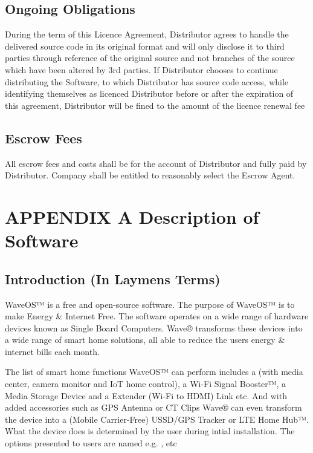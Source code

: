 \documentclass[letterpaper,10pt,openany,oneside,english]{sphinxmanual}
\begin{document}
\subsection{Ongoing Obligations}
\label{\detokenize{escrow:ongoing-obligations}}
During the term of this Licence Agreement, Distributor agrees to handle the delivered source code in its original format and will only disclose it to third parties through reference of the original source and not branches of the source which have been altered by 3rd parties. If Distributor chooses to continue distributing the Software, to which Distributor has source code access, while identifying themselves as licenced Distributor before or after the expiration of this agreement, Distributor will be fined to the amount of the licence renewal fee


\subsection{Escrow Fees}
\label{\detokenize{escrow:escrow-fees}}
All escrow fees and costs shall be for the account of Distributor and fully paid by Distributor. Company shall be entitled to reasonably select the Escrow Agent.


\section{APPENDIX A \textendash{} Description of Software}
\label{\detokenize{appendix-a:appendix-a-description-of-software}}\label{\detokenize{appendix-a::doc}}


\subsection{Introduction (In Laymens Terms)}
\label{\detokenize{appendix-a:introduction-in-laymens-terms}}
WaveOS™ is a free and open-source software. The purpose of WaveOS™ is to make Energy \& Internet Free. The software operates on a wide range of hardware devices known as Single Board Computers. Wave® transforms these devices into a wide range of smart home solutions, all able to reduce the users energy \& internet bills each month.

The list of smart home functions WaveOS™ can perform includes a  (with media center, camera monitor and IoT home control), a Wi-Fi Signal Booster™, a Media Storage Device and a Extender (Wi-Fi to HDMI) Link etc. And with added accessories such as GPS Antenna or CT Clips Wave® can even transform the device into a (Mobile Carrier-Free) USSD/GPS Tracker or LTE Home Hub™. What the device does is determined by the user during intial installation. The options presented to users are named  e.g. ,  etc
\end{document}
